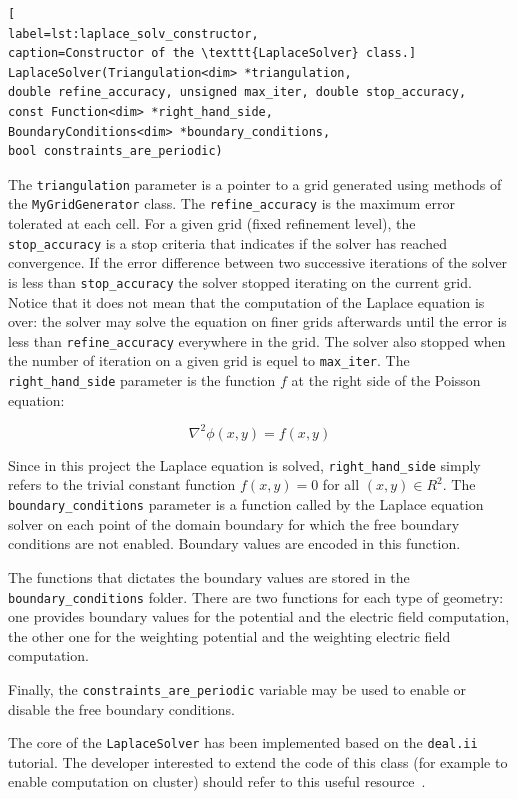 \documentclass[11pt]{article}
\begin{document}
		\begin{lstlisting}[
label=lst:laplace_solv_constructor,
caption=Constructor of the \texttt{LaplaceSolver} class.]
LaplaceSolver(Triangulation<dim> *triangulation,
double refine_accuracy, unsigned max_iter, double stop_accuracy,
const Function<dim> *right_hand_side,
BoundaryConditions<dim> *boundary_conditions,
bool constraints_are_periodic)
		\end{lstlisting}

		The \texttt{triangulation} parameter is a pointer to a grid generated using methods of
		the \texttt{MyGridGenerator} class. The \texttt{refine\_accuracy} is the maximum
		error tolerated at each cell. For a given grid (fixed refinement level),
		the \texttt{stop\_accuracy}  is a stop criteria that indicates if the solver has
		reached convergence. If the error difference between two successive iterations
		of the solver is less than \texttt{stop\_accuracy} the solver stopped iterating
		on the current grid. Notice that it does not mean that the computation of the
		Laplace equation is over: the solver may solve the equation on finer grids
		afterwards until the error is less than \texttt{refine\_accuracy} everywhere
		in the grid. The solver also stopped when the number of iteration on a given
		grid is equel to \texttt{max\_iter}. The \texttt{right\_hand\_side} parameter
		is the function $f$ at the right side of the Poisson equation:

		\[\nabla^2 \phi(x,y) = f(x,y)\]

		Since in this project the Laplace equation is solved, \texttt{right\_hand\_side}
		simply refers to the trivial constant function $f(x,y) = 0$ for all $(x,y) \in R^2$.
		The \texttt{boundary\_conditions} parameter is a function called by the Laplace
		equation solver on each point of the domain boundary for which the free
		boundary conditions are not enabled. Boundary values are encoded in this function.

		The functions that dictates the boundary values are stored in the
		\texttt{boundary\_conditions} folder. There are two functions for each
		type of geometry: one provides boundary values for the potential and the electric
		field computation, the other one for the weighting potential and the weighting
		electric field computation.

		Finally, the \texttt{constraints\_are\_periodic} variable may be used to
		enable or disable the free boundary conditions.

		The core of the \texttt{LaplaceSolver} has been implemented based on the
		\texttt{deal.ii} tutorial. The developer interested to extend the code of this
		class (for example to enable computation on cluster) should refer to this
		useful resource~\cite{deal.iituto}.
\end{document}
